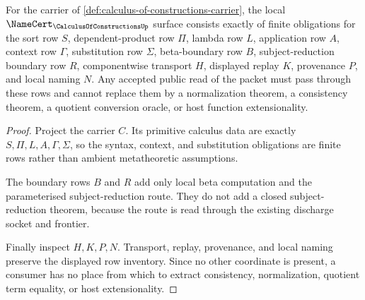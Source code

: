 \begin{theorem}
\label{thm:calculus-of-constructions-namecert-obligations}
For the carrier of \autoref{def:calculus-of-constructions-carrier}, the local $\NameCert_{\CalculusOfConstructionsUp}$ surface consists exactly of finite obligations for the sort row $S$, dependent-product row $\Pi$, lambda row $L$, application row $A$, context row $\Gamma$, substitution row $\Sigma$, beta-boundary row $B$, subject-reduction boundary row $R$, componentwise transport $H$, displayed replay $K$, provenance $P$, and local naming $N$. Any accepted public read of the packet must pass through these rows and cannot replace them by a normalization theorem, a consistency theorem, a quotient conversion oracle, or host function extensionality.
\end{theorem}
\begin{proof}
Project the carrier $C$. Its primitive calculus data are exactly $S,\Pi,L,A,\Gamma,\Sigma$, so the syntax, context, and substitution obligations are finite rows rather than ambient metatheoretic assumptions.

The boundary rows $B$ and $R$ add only local beta computation and the parameterised subject-reduction route. They do not add a closed subject-reduction theorem, because the route is read through the existing discharge socket and frontier.

Finally inspect $H,K,P,N$. Transport, replay, provenance, and local naming preserve the displayed row inventory. Since no other coordinate is present, a consumer has no place from which to extract consistency, normalization, quotient term equality, or host extensionality.
\end{proof}

